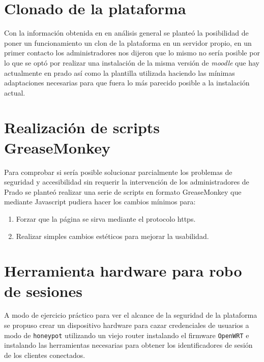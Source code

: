 \section{Clonado de la plataforma}

Con la información obtenida en en análisis general se planteó la posibilidad de poner un funcionamiento un clon de la plataforma en un servidor propio, en un primer contacto los administradores nos dijeron que lo mismo no sería posible por lo que se optó por realizar una instalación de la misma versión de \textit{moodle} que hay actualmente en prado así como la plantilla utilizada haciendo las mínimas adaptaciones necesarias para que fuera lo más parecido posible a la instalación actual.

\section{Realización de scripts GreaseMonkey}

Para comprobar si sería posible solucionar parcialmente los problemas de seguridad y accesibilidad sin requerir la intervención de los administradores de Prado se planteó realizar una serie de scripts en formato GreaseMonkey que mediante Javascript pudiera hacer los cambios mínimos para:

  		\begin{enumerate}
  			\item Forzar que la página se sirva mediante el protocolo https.
            \item Realizar simples cambios estéticos para mejorar la usabilidad.
        \end{enumerate}

\section{Herramienta hardware para robo de sesiones}

A modo de ejercicio práctico para ver el alcance de la seguridad de la plataforma se propuso crear un dispositivo hardware para cazar credenciales de usuarios a modo de \texttt{honeypot} utilizando un viejo router instalando el firmware \texttt{OpenWRT} \cite{openwrt} e instalando las herramientas necesarias para obtener los identificadores de sesión de los clientes conectados.



